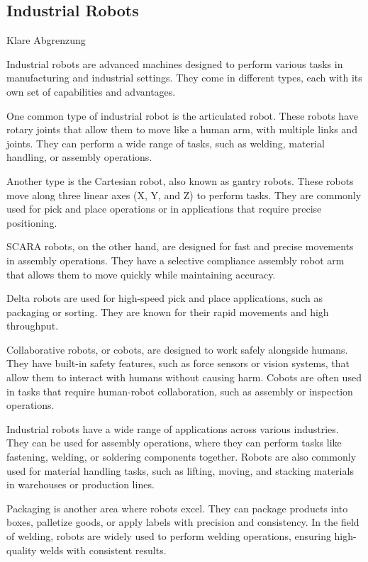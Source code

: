 \subsection{Industrial Robots}\label{IR}
Klare Abgrenzung

Industrial robots are advanced machines designed to perform various tasks in manufacturing and industrial settings. They come in different types, each with its own set of capabilities and advantages.

One common type of industrial robot is the articulated robot. These robots have rotary joints that allow them to move like a human arm, with multiple links and joints. They can perform a wide range of tasks, such as welding, material handling, or assembly operations.

Another type is the Cartesian robot, also known as gantry robots. These robots move along three linear axes (X, Y, and Z) to perform tasks. They are commonly used for pick and place operations or in applications that require precise positioning.

SCARA robots, on the other hand, are designed for fast and precise movements in assembly operations. They have a selective compliance assembly robot arm that allows them to move quickly while maintaining accuracy.

Delta robots are used for high-speed pick and place applications, such as packaging or sorting. They are known for their rapid movements and high throughput.

Collaborative robots, or cobots, are designed to work safely alongside humans. They have built-in safety features, such as force sensors or vision systems, that allow them to interact with humans without causing harm. Cobots are often used in tasks that require human-robot collaboration, such as assembly or inspection operations.

Industrial robots have a wide range of applications across various industries. They can be used for assembly operations, where they can perform tasks like fastening, welding, or soldering components together. Robots are also commonly used for material handling tasks, such as lifting, moving, and stacking materials in warehouses or production lines.

Packaging is another area where robots excel. They can package products into boxes, palletize goods, or apply labels with precision and consistency. In the field of welding, robots are widely used to perform welding operations, ensuring high-quality welds with consistent results.

